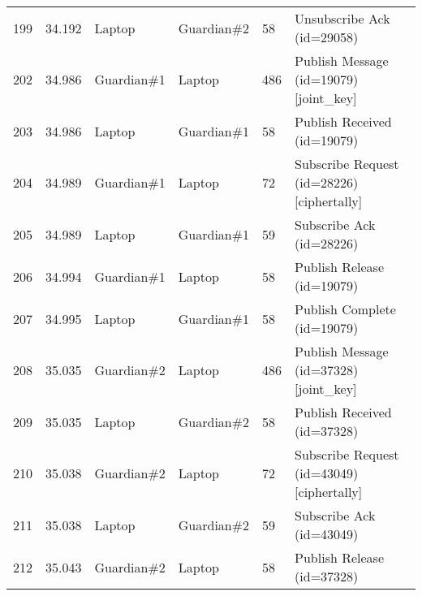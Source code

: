 \begin{table}[]
\begin{tabular}{llllll}
199 & 34.192 & Laptop      & Guardian\#2 & 58     & Unsubscribe Ack (id=29058)                                                                                                             \\
202 & 34.986 & Guardian\#1 & Laptop      & 486    & Publish Message (id=19079) {[}joint\_key{]}                                                                                            \\
203 & 34.986 & Laptop      & Guardian\#1 & 58     & Publish Received (id=19079)                                                                                                            \\
204 & 34.989 & Guardian\#1 & Laptop      & 72     & Subscribe Request (id=28226) {[}ciphertally{]}                                                                                         \\
205 & 34.989 & Laptop      & Guardian\#1 & 59     & Subscribe Ack (id=28226)                                                                                                               \\
206 & 34.994 & Guardian\#1 & Laptop      & 58     & Publish Release (id=19079)                                                                                                             \\
207 & 34.995 & Laptop      & Guardian\#1 & 58     & Publish Complete (id=19079)                                                                                                            \\
208 & 35.035 & Guardian\#2 & Laptop      & 486    & Publish Message (id=37328) {[}joint\_key{]}                                                                                            \\
209 & 35.035 & Laptop      & Guardian\#2 & 58     & Publish Received (id=37328)                                                                                                            \\
210 & 35.038 & Guardian\#2 & Laptop      & 72     & Subscribe Request (id=43049) {[}ciphertally{]}                                                                                         \\
211 & 35.038 & Laptop      & Guardian\#2 & 59     & Subscribe Ack (id=43049)                                                                                                               \\
212 & 35.043 & Guardian\#2 & Laptop      & 58     & Publish Release (id=37328)                                                                                                             \\

\end{tabular}
\end{table}
